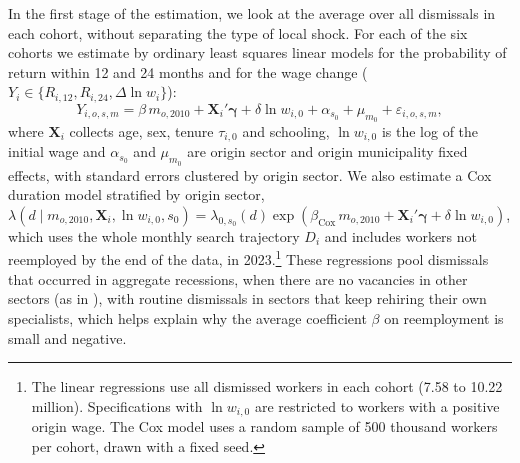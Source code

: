 \documentclass[11pt,a4paper]{article}
\let\citealtorig\citealt
\renewcommand{\citealt}[1]{{\color{citeblue}\citealtorig{#1}}}
\begin{document}
In the first stage of the estimation, we look at the average over all dismissals in each cohort, without separating the type of local shock. For each of the six cohorts we estimate by ordinary least squares linear models for the probability of return within 12 and 24 months and for the wage change ($Y_i \in \{R_{i,12}, R_{i,24}, \Delta \ln w_i\}$):
\begin{equation}
Y_{i,o,s,m} = \beta\, m_{o,2010} + \mathbf{X}_i'\boldsymbol{\gamma} + \delta \ln w_{i,0} + \alpha_{s_0} + \mu_{m_0} + \varepsilon_{i,o,s,m},
\label{eq:mpl_feols}
\end{equation}
where $\mathbf{X}_i$ collects age, sex, tenure $\tau_{i,0}$ and schooling, $\ln w_{i,0}$ is the log of the initial wage and $\alpha_{s_0}$ and $\mu_{m_0}$ are origin sector and origin municipality fixed effects, with standard errors clustered by origin sector. We also estimate a Cox duration model stratified by origin sector, $\lambda(d \mid m_{o,2010}, \mathbf{X}_i, \ln w_{i,0}, s_0) = \lambda_{0,s_0}(d)\exp(\beta_{\text{Cox}}\, m_{o,2010} + \mathbf{X}_i'\boldsymbol{\gamma} + \delta \ln w_{i,0})$, which uses the whole monthly search trajectory $D_i$ and includes workers not reemployed by the end of the data, in 2023.\footnote{The linear regressions use all dismissed workers in each cohort (7.58 to 10.22 million). Specifications with $\ln w_{i,0}$ are restricted to workers with a positive origin wage. The Cox model uses a random sample of 500 thousand workers per cohort, drawn with a fixed seed.} These regressions pool dismissals that occurred in aggregate recessions, when there are no vacancies in other sectors (as in \citealt{abraham1986}), with routine dismissals in sectors that keep rehiring their own specialists, which helps explain why the average coefficient $\beta$ on reemployment is small and negative.
\end{document}
